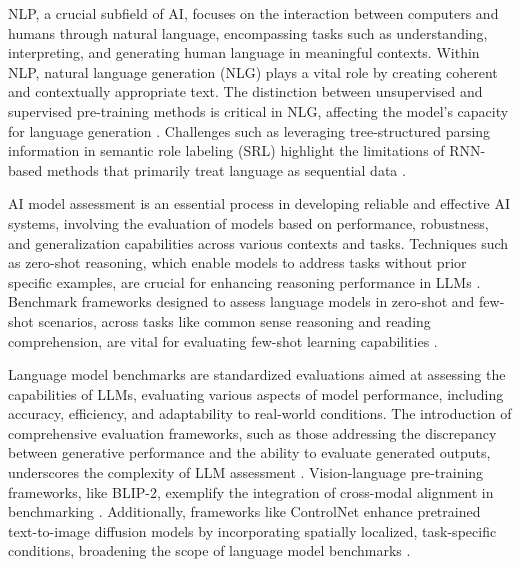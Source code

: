 NLP, a crucial subfield of AI, focuses on the interaction between computers and humans through natural language, encompassing tasks such as understanding, interpreting, and generating human language in meaningful contexts. Within NLP, natural language generation (NLG) plays a vital role by creating coherent and contextually appropriate text. The distinction between unsupervised and supervised pre-training methods is critical in NLG, affecting the model's capacity for language generation \cite{tan2022naturalspeechendtoendtextspeech}. Challenges such as leveraging tree-structured parsing information in semantic role labeling (SRL) highlight the limitations of RNN-based methods that primarily treat language as sequential data \cite{raposo2019lowdimensionalembodiedsemanticsmusic}.



AI model assessment is an essential process in developing reliable and effective AI systems, involving the evaluation of models based on performance, robustness, and generalization capabilities across various contexts and tasks. Techniques such as zero-shot reasoning, which enable models to address tasks without prior specific examples, are crucial for enhancing reasoning performance in LLMs \cite{hsu2023whatsleftconceptgrounding}. Benchmark frameworks designed to assess language models in zero-shot and few-shot scenarios, across tasks like common sense reasoning and reading comprehension, are vital for evaluating few-shot learning capabilities .



Language model benchmarks are standardized evaluations aimed at assessing the capabilities of LLMs, evaluating various aspects of model performance, including accuracy, efficiency, and adaptability to real-world conditions. The introduction of comprehensive evaluation frameworks, such as those addressing the discrepancy between generative performance and the ability to evaluate generated outputs, underscores the complexity of LLM assessment \cite{narayanan2023democratizecareneedfairness}. Vision-language pre-training frameworks, like BLIP-2, exemplify the integration of cross-modal alignment in benchmarking \cite{reddy2024docfinqalongcontextfinancialreasoning}. Additionally, frameworks like ControlNet enhance pretrained text-to-image diffusion models by incorporating spatially localized, task-specific conditions, broadening the scope of language model benchmarks \cite{shi2019newevaluationframeworktopic}.



